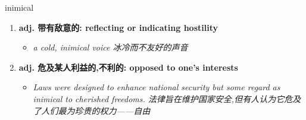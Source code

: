 
\begin{frame}
{\huge inimical}
\begin{center}
\begin{enumerate}\Large
  \item \textbf{adj. 带有敌意的: reflecting or indicating hostility}
  \begin{itemize}
    \item \em{\Large{a cold, inimical voice 冰冷而不友好的声音}}
  \end{itemize}
  \item \textbf{adj. 危及某人利益的,不利的: opposed to one's interests}
  \begin{itemize}
    \item \em{\Large{Laws were designed to enhance national security but some regard as inimical to cherished freedoms. 法律旨在维护国家安全,但有人认为它危及了人们最为珍贵的权力——自由}}
  \end{itemize}
\end{enumerate}
\end{center}
\end{frame}
